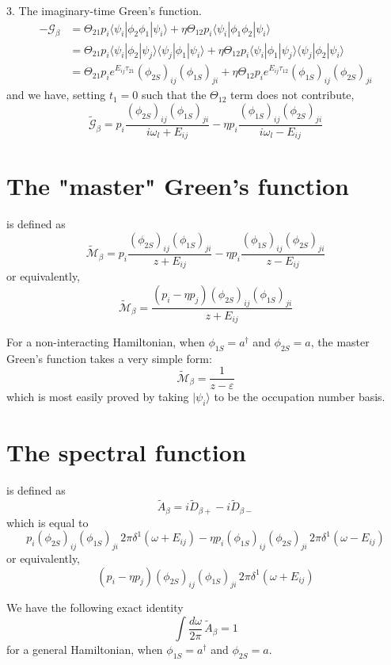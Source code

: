\documentclass[12pt, oneside]{book}
\begin{document}
3. The imaginary-time Green's function.
\begin{align*}
-\mathcal{G}_{\beta}
&=\Theta_{21}p_i\langle\psi_i|\phi_2\phi_1|\psi_i\rangle+\eta\Theta_{12}p_i\langle\psi_i|\phi_1\phi_2|\psi_i\rangle\\
&=\Theta_{21}p_i\langle\psi_i|\phi_2|\psi_j\rangle\langle\psi_j|\phi_1|\psi_i\rangle+\eta\Theta_{12}p_i\langle\psi_i|\phi_1|\psi_j\rangle\langle\psi_j|\phi_2|\psi_i\rangle\\
&=\Theta_{21}p_ie^{E_{ij}\tau_{21}}(\phi_{2S})_{ij}(\phi_{1S})_{ji}+\eta\Theta_{12}p_ie^{E_{ij}\tau_{12}}(\phi_{1S})_{ij}(\phi_{2S})_{ji}
\end{align*}
and we have, setting $t_1=0$ such that the $\Theta_{12}$ term does not contribute,
\[
\widetilde{\mathcal{G}}_{\beta}=p_i\frac{(\phi_{2S})_{ij}(\phi_{1S})_{ji}}{i\omega_l+E_{ij}}-\eta p_i\frac{(\phi_{1S})_{ij}(\phi_{2S})_{ji}}{i\omega_l-E_{ij}}
\]

\section*{The "master" Green's function}
is defined as
\[
\widetilde{\mathcal{M}}_{\beta}=p_i\frac{(\phi_{2S})_{ij}(\phi_{1S})_{ji}}{z+E_{ij}}-\eta p_i\frac{(\phi_{1S})_{ij}(\phi_{2S})_{ji}}{z-E_{ij}}
\]
or equivalently,
\[
\widetilde{\mathcal{M}}_{\beta}=\frac{(p_i-\eta p_j)(\phi_{2S})_{ij}(\phi_{1S})_{ji}}{z+E_{ij}}
\]

For a non-interacting Hamiltonian, when $\phi_{1S}=a^{\dagger}$ and $\phi_{2S}=a$, the master Green's function takes a very simple form:
\[
\widetilde{\mathcal{M}}_{\beta}=\frac1{z-\varepsilon}
\]
which is most easily proved by taking $|\psi_i\rangle$ to be the occupation number basis.

\section*{The spectral function}
is defined as
\[
\widetilde{A}_{\beta}=i\widetilde{D}_{\beta+}-i\widetilde{D}_{\beta-}
\]
which is equal to
\[
p_i(\phi_{2S})_{ij}(\phi_{1S})_{ji}\,2\pi\delta^1(\omega+E_{ij})-\eta p_i(\phi_{1S})_{ij}(\phi_{2S})_{ji}\,2\pi\delta^1(\omega-E_{ij})
\]
or equivalently,
\[
(p_i-\eta p_j)(\phi_{2S})_{ij}(\phi_{1S})_{ji}\,2\pi\delta^1(\omega+E_{ij})
\]

We have the following exact identity
\[
\int\frac{d\omega}{2\pi}\,\widetilde{A}_{\beta}=1
\]
for a general Hamiltonian, when $\phi_{1S}=a^{\dagger}$ and $\phi_{2S}=a$.
\end{document}

